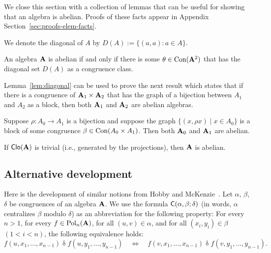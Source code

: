 We close this section with a collection of lemmas that can be useful for showing 
that an algebra is abelian.  Proofs of these facts appear in Appendix
Section~\ref{sec:proofs-elem-facts}.

We denote the diagonal of $A$ by $D(A) := \{(a,a): a \in A\}$. 
\begin{lem}
\label{lem:diagonal}
An algebra $\mathbf{A}$ is abelian if and only if there is some $\theta \in \operatorname{Con} (\mathbf{A}^2)$ that has
the diagonal set $D(A)$ as a congruence class.
\end{lem}

Lemma~\ref{lem:diagonal} can be used to prove the next result
which states that if there is a congruence of $\mathbf{A}_1 \times \mathbf{A}_2$ that has the
graph of a bijection between $A_1$ and $A_2$ as a block, then both $\mathbf{A}_1$ and
$\mathbf{A}_2$ are abelian algebras.

\begin{lem}
  \label{lem:bijection_abelian}
Suppose $\rho \colon A_0 \to A_1$ is a bijection and suppose the graph
$\{(x, \rho x) \mid x \in A_0\}$ is a block of some congruence
$\beta \in \operatorname{Con} (A_0 \times A_1)$.  Then both $\mathbf{A}_0$ and $\mathbf{A}_1$ are abelian.
\end{lem}

\begin{lem}
\label{lem:triv-clone-implies-abelian}
If $\operatorname{\mathsf{Clo}}(\mathbf{A})$ is trivial (i.e., generated by the projections),
then $\mathbf{A}$ is abelian.
\end{lem}















\subsection{Alternative development}
Here is the development of similar notions from Hobby and McKenzie~\cite[Ch.~3]{HM:1988}.
Let $\alpha$, $\beta$, $\delta$ be congruences of an algebra $\mathbf{A}$.
We use the formula $\mathsf{C}(\alpha, \beta; \delta)$
(in words, $\alpha$ centralizes $\beta$ modulo $\delta$) as an abbreviation for the
following property: For every $n > 1$, for every $f \in \operatorname{Pol}_n(\mathbf{A})$,
for all $(u,v)\in \alpha$, and for all $(x_i, y_i)\in \beta$ $(1< i<n)$, 
the following equivalence holds:
\begin{equation}
  \label{eq:1}
  f(u, x_1, \dots, x_{n-1}) \mathrel{\delta}  f(u, y_1, \dots, y_{n-1})
  \quad \iff \quad
  f(v, x_1, \dots, x_{n-1}) \mathrel{\delta}  f(v, y_1, \dots, y_{n-1}).
\end{equation}
